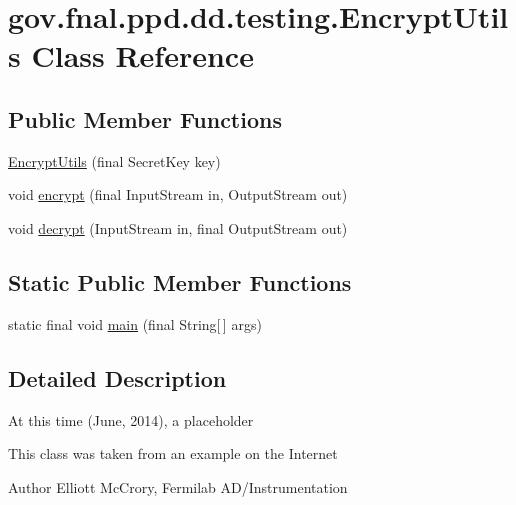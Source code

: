 \hypertarget{classgov_1_1fnal_1_1ppd_1_1dd_1_1testing_1_1EncryptUtils}{\section{gov.\-fnal.\-ppd.\-dd.\-testing.\-Encrypt\-Utils Class Reference}
\label{classgov_1_1fnal_1_1ppd_1_1dd_1_1testing_1_1EncryptUtils}
}
\subsection*{Public Member Functions}
\begin{DoxyCompactItemize}
\item 
\hyperlink{classgov_1_1fnal_1_1ppd_1_1dd_1_1testing_1_1EncryptUtils_aa8bb396d18fcafa060226b0f174517a5}{Encrypt\-Utils} (final Secret\-Key key)
\item 
void \hyperlink{classgov_1_1fnal_1_1ppd_1_1dd_1_1testing_1_1EncryptUtils_a2124544afc9b1291faa2716f513014b7}{encrypt} (final Input\-Stream in, Output\-Stream out)
\item 
void \hyperlink{classgov_1_1fnal_1_1ppd_1_1dd_1_1testing_1_1EncryptUtils_a1091f8f8bf3dd0e08d95844788833bd3}{decrypt} (Input\-Stream in, final Output\-Stream out)
\end{DoxyCompactItemize}
\subsection*{Static Public Member Functions}
\begin{DoxyCompactItemize}
\item 
static final void \hyperlink{classgov_1_1fnal_1_1ppd_1_1dd_1_1testing_1_1EncryptUtils_a075e734397c22f6dbfc75fe827ef6724}{main} (final String\mbox{[}$\,$\mbox{]} args)
\end{DoxyCompactItemize}


\subsection{Detailed Description}
At this time (June, 2014), a placeholder

This class was taken from an example on the Internet

\begin{DoxyAuthor}{Author}
Elliott Mc\-Crory, Fermilab A\-D/\-Instrumentation 
\end{DoxyAuthor}


